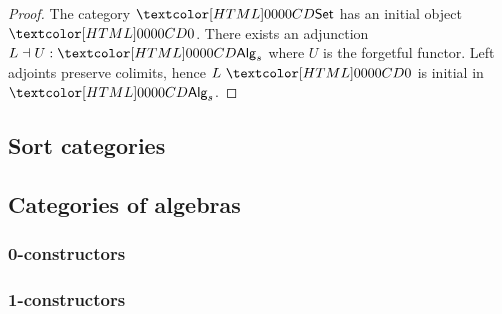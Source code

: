 \begin{proof}
  The category $\Set$ has an initial object $\initty$. There exists an
  adjunction $L \dashv U : \Alg_s$ where $U$ is the
  forgetful functor. Left adjoints preserve colimits, hence
  $L\ \initty$ is initial in $\Alg_s$.
\end{proof}

\subsection{Sort categories}


\subsection{Categories of algebras}

\subsubsection{0-constructors}

\subsubsection{1-constructors}

